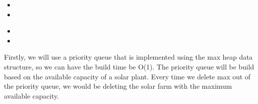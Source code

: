 \documentclass[12pt,twoside]{article}
\begin{document}
\begin{problems}
\begin{problemparts}
\begin{itemize}
\begin{tikzpicture}
\end{tikzpicture}
    \item 
{}

    \item 
{}

\end{itemize}

\newpage

\problempart %
\begin{itemize}
\item
\item
{}
\end{itemize}

\end{problemparts}




\newpage
\problem  %

\begin{problemparts}
\problempart %
\problempart %
\problempart %
\problempart %
\end{problemparts}

\newpage
\problem  %

\begin{problemparts}
\problempart %
\problempart %
\end{problemparts}

\newpage
\problem  %
Firstly, we will use a priority queue that is implemented using the max heap data structure, so we can have the build time be O(1). The priority queue will be build based on the available capacity of a solar plant. Every time we delete max out of the priority queue, we would be deleting the solar farm with the maximum available capacity.


\end{problems}
\end{document}
